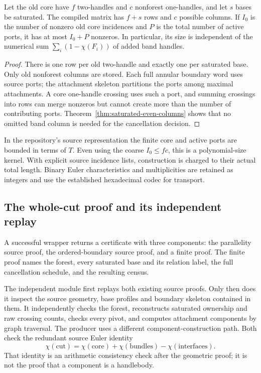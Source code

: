 \begin{proposition}
\label{prop:compiled-size}
Let the old core have $f$ two-handles and $c$ nonforest one-handles, and
let $s$ bases be saturated. The compiled matrix has $f+s$ rows and $c$
possible columns. If $I_0$ is the number of nonzero old core incidences
and $P$ is the total number of active ports, it has at most $I_0+P$
nonzeros. In particular, its size is independent of the numerical sum
$\sum_i(1-\chi(F_i))$ of added band handles.
\end{proposition}

\begin{proof}
There is one row per old two-handle and exactly one per saturated base.
Only old nonforest columns are stored. Each full annular boundary word
uses source ports; the attachment skeleton partitions the ports among
maximal attachments. A core one-handle crossing uses such a port, and
summing crossings into rows can merge nonzeros but cannot create more
than the number of contributing ports. Theorem~\ref{thm:saturated-even-columns}
shows that no omitted band column is needed for the cancellation decision.
\end{proof}

In the repository's source representation the finite core and active
ports are bounded in terms of $T$\cite{repo}. Even using the coarse
$I_0\le fc$, this is a polynomial-size kernel. With explicit source
incidence lists, construction is charged to their actual total length.
Binary Euler characteristics and multiplicities are retained as integers
and use the established hexadecimal codec for transport.

\subsection{The whole-cut proof and its independent replay}

A successful wrapper returns a  certificate
with three components: the parallelity source proof, the ordered-boundary
source proof, and a  finite proof. The
finite proof names the forest, every saturated base and its relation label,
the full cancellation schedule, and the resulting census.

The independent  module first replays
both existing source proofs. Only then does it inspect the source geometry,
base profiles and boundary skeleton contained in them. It independently
checks the forest, reconstructs saturated ownership and raw crossing
counts, checks every pivot, and computes attachment components by graph
traversal. The producer uses a different component-construction path.
Both check the redundant source Euler identity
\[
 \chi(\text{cut})=\chi(\text{core})+\chi(\text{bundles})
                  -\chi(\text{interfaces}).
\]
That identity is an arithmetic consistency check after the geometric proof;
it is not the proof that a component is a handlebody.

